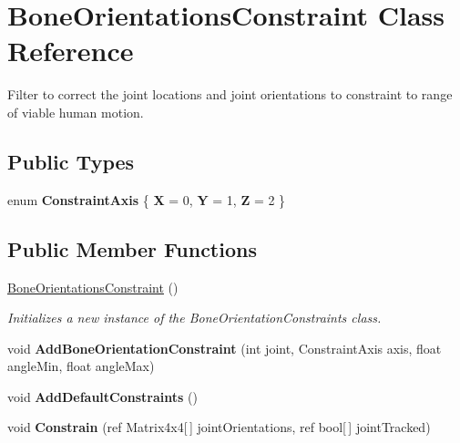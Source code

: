 \hypertarget{class_bone_orientations_constraint}{}\section{Bone\+Orientations\+Constraint Class Reference}
\label{class_bone_orientations_constraint}


Filter to correct the joint locations and joint orientations to constraint to range of viable human motion.  


\subsection*{Public Types}
\begin{DoxyCompactItemize}
\item 
\mbox{\label{class_bone_orientations_constraint_a1f4aa21ffa8dbc27a16143698d71e63d}} 
enum {\bfseries Constraint\+Axis} \{ {\bfseries X} = 0, 
{\bfseries Y} = 1, 
{\bfseries Z} = 2
 \}
\end{DoxyCompactItemize}
\subsection*{Public Member Functions}
\begin{DoxyCompactItemize}
\item 
\mbox{\label{class_bone_orientations_constraint_a8f9232ef89117f7a5ea6977acf5ce622}} 
\mbox{\hyperlink{class_bone_orientations_constraint_a8f9232ef89117f7a5ea6977acf5ce622}{Bone\+Orientations\+Constraint}} ()
\begin{DoxyCompactList}\small\item\em Initializes a new instance of the Bone\+Orientation\+Constraints class. \end{DoxyCompactList}\item 
\mbox{\label{class_bone_orientations_constraint_ab9dcd6608443e194a4c3a098baec5138}} 
void {\bfseries Add\+Bone\+Orientation\+Constraint} (int joint, Constraint\+Axis axis, float angle\+Min, float angle\+Max)
\item 
\mbox{\label{class_bone_orientations_constraint_a9c6fb36deaa012c5ca393200ed273986}} 
void {\bfseries Add\+Default\+Constraints} ()
\item 
\mbox{\label{class_bone_orientations_constraint_a8387f8886926069be888c2aca2ddb1e8}} 
void {\bfseries Constrain} (ref Matrix4x4\mbox{[}$\,$\mbox{]} joint\+Orientations, ref bool\mbox{[}$\,$\mbox{]} joint\+Tracked)
\end{DoxyCompactItemize}


